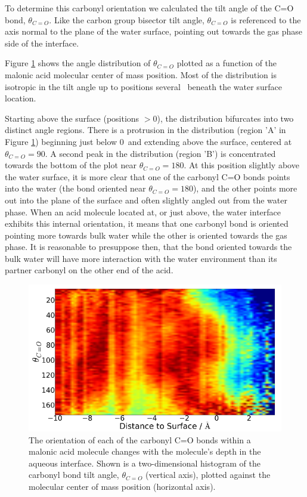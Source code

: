 To determine this carbonyl orientation we calculated the tilt angle of the C=O bond, $\theta_{C=O}$. Like the carbon group bisector tilt angle, $\theta_{C=O}$ is referenced to the axis normal to the plane of the water surface, pointing out towards the gas phase side of the interface.

Figure \ref{fig:carbonyl-tilt} shows the angle distribution of $\theta_{C=O}$ plotted as a function of the malonic acid molecular center of mass position. Most of the distribution is isotropic in the tilt angle up to positions several \angs~beneath the water surface location.

Starting above the surface (positions $>0$\angs), the distribution bifurcates into two distinct angle regions. There is a protrusion in the distribution (region 'A' in Figure \ref{fig:carbonyl-tilt}) beginning just below 0\angs~and extending above the surface, centered at $\theta_{C=O}=90$\textdegree. A second peak in the distribution (region 'B') is concentrated towards the bottom of the plot near $\theta_{C=O}=180$\textdegree. At this position slightly above the water surface, it is more clear that one of the carbonyl C=O bonds points into the water (the bond oriented near $\theta_{C=O}=180$\textdegree), and the other points more out into the plane of the surface and often slightly angled out from the water phase.  When an acid molecule located at, or just above, the water interface exhibits this internal orientation, it means that one carbonyl bond is oriented pointing more towards bulk water while the other is oriented towards the gas phase. It is reasonable to presuppose then, that the bond oriented towards the bulk water will have more interaction with the water environment than its partner carbonyl on the other end of the acid.


\begin{figure}[h!]
	\begin{center}
		\includegraphics[scale=1.0]{images/malonic-angles/carbonyl-theta-distance.png}
		\caption{The orientation of each of the carbonyl C=O bonds within a malonic acid molecule changes with the molecule's depth in the aqueous interface. Shown is a two-dimensional histogram of the carbonyl bond tilt angle, $\theta_{C=O}$ (vertical axis), plotted against the molecular center of mass position (horizontal axis).}  
		\label{fig:carbonyl-tilt}
	\end{center}
\end{figure}


